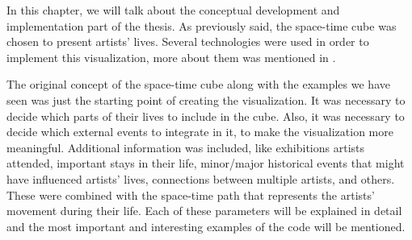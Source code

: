 In this chapter, we will talk about the conceptual development and implementation part of the thesis. As previously said, the space-time cube was chosen to present
artists' lives. Several technologies were used in order to implement this visualization, more about them was mentioned in .

The original concept of the space-time cube along with the examples we have seen was just the starting point of creating the visualization. It was
necessary to decide which parts of their lives to include in the cube. Also, it was necessary to decide which external events to integrate in it,
to make the visualization more meaningful. Additional information was included, like exhibitions artists attended, important stays in their life,
minor/major historical events that might have influenced artists' lives, connections between multiple artists, and others. These were combined
with the space-time path that represents the artists' movement during their life. Each of these parameters will be explained in detail and the
most important and interesting examples of the code will be mentioned.

\clearpage

